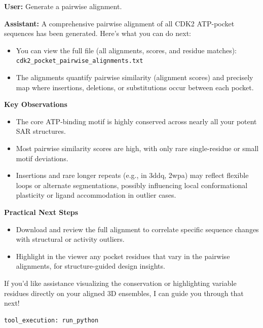 \documentclass{article}
\begin{document}
\vspace{1.5em}

\begin{userbox}
\textbf{User:} Generate a pairwise alignment.
\end{userbox}

\begin{assistantbox}
\textbf{Assistant:} A comprehensive pairwise alignment of all CDK2 ATP-pocket sequences has been generated. Here's what you can do next:
\begin{itemize}
    \item You can view the full file (all alignments, scores, and residue matches):\\
    \texttt{cdk2\_pocket\_pairwise\_alignments.txt}
    \item The alignments quantify pairwise similarity (alignment scores) and precisely map where insertions, deletions, or substitutions occur between each pocket.
\end{itemize}

\textbf{Key Observations}
\begin{itemize}
    \item The core ATP-binding motif is highly conserved across nearly all your potent SAR structures.
    \item Most pairwise similarity scores are high, with only rare single-residue or small motif deviations.
    \item Insertions and rare longer repeats (e.g., in 3ddq, 2wpa) may reflect flexible loops or alternate segmentations, possibly influencing local conformational plasticity or ligand accommodation in outlier cases.
\end{itemize}

\textbf{Practical Next Steps}
\begin{itemize}
    \item Download and review the full alignment to correlate specific sequence changes with structural or activity outliers.
    \item Highlight in the viewer any pocket residues that vary in the pairwise alignments, for structure-guided design insights.
\end{itemize}

If you'd like assistance visualizing the conservation or highlighting variable residues directly on your aligned 3D ensembles, I can guide you through that next!
\begin{verbatim}
tool_execution: run_python
\end{verbatim}
\end{assistantbox}
\end{document}
